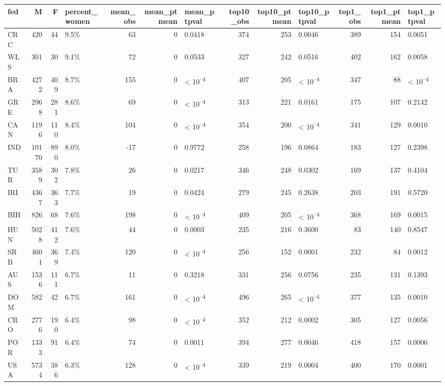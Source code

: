 
\begin{tabular}{l|r|r|l|r|r|l|r|r|l|r|r|l}
\hline
fed & M & F & percent_women & mean_obs & mean_ptmean & mean_ptpval & top10_obs & top10_ptmean & top10_ptpval & top1_obs & top1_ptmean & top1_ptpval\\
\hline
CRC & 420 & 44 & 9.5\% & 63 & 0 & 0.0418 & 374 & 253 & 0.0046 & 389 & 154 & 0.0051\\
\hline
WLS & 301 & 30 & 9.1\% & 72 & 0 & 0.0533 & 327 & 242 & 0.0516 & 402 & 162 & 0.0058\\
\hline
BRA & 4272 & 409 & 8.7\% & 155 & 0 & < 10\textsuperscript{--4} & 407 & 205 & < 10\textsuperscript{--4} & 347 & 88 & < 10\textsuperscript{--4}\\
\hline
GRE & 2968 & 281 & 8.6\% & 69 & 0 & < 10\textsuperscript{--4} & 313 & 221 & 0.0161 & 175 & 107 & 0.2142\\
\hline
CAN & 1196 & 110 & 8.4\% & 104 & 0 & < 10\textsuperscript{--4} & 354 & 200 & < 10\textsuperscript{--4} & 341 & 129 & 0.0010\\
\hline
IND & 10170 & 890 & 8.0\% & -17 & 0 & 0.9772 & 258 & 196 & 0.0864 & 183 & 127 & 0.2398\\
\hline
TUR & 3589 & 302 & 7.8\% & 26 & 0 & 0.0217 & 346 & 248 & 0.0302 & 169 & 137 & 0.4104\\
\hline
IRI & 4367 & 363 & 7.7\% & 19 & 0 & 0.0424 & 279 & 245 & 0.2638 & 203 & 191 & 0.5720\\
\hline
BIH & 826 & 68 & 7.6\% & 198 & 0 & < 10\textsuperscript{--4} & 409 & 205 & < 10\textsuperscript{--4} & 368 & 169 & 0.0015\\
\hline
HUN & 5028 & 412 & 7.6\% & 44 & 0 & 0.0003 & 235 & 216 & 0.3600 & 83 & 140 & 0.8547\\
\hline
SRB & 4601 & 369 & 7.4\% & 120 & 0 & < 10\textsuperscript{--4} & 256 & 152 & 0.0001 & 232 & 84 & 0.0012\\
\hline
AUS & 1536 & 111 & 6.7\% & 11 & 0 & 0.3218 & 331 & 256 & 0.0756 & 235 & 131 & 0.1393\\
\hline
DOM & 582 & 42 & 6.7\% & 161 & 0 & < 10\textsuperscript{--4} & 496 & 265 & < 10\textsuperscript{--4} & 377 & 135 & 0.0010\\
\hline
CRO & 2776 & 190 & 6.4\% & 98 & 0 & < 10\textsuperscript{--4} & 352 & 212 & 0.0002 & 305 & 127 & 0.0056\\
\hline
POR & 1333 & 91 & 6.4\% & 74 & 0 & 0.0011 & 394 & 277 & 0.0046 & 418 & 157 & 0.0006\\
\hline
USA & 5734 & 386 & 6.3\% & 128 & 0 & < 10\textsuperscript{--4} & 339 & 219 & 0.0004 & 400 & 170 & 0.0001\\

\end{tabular}
